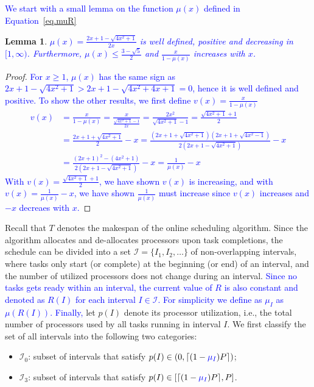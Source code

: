 \documentclass{article}
\newtheorem{lemma}{Lemma}
\newcommand\ratio{R\xspace}
\newcommand{\new}[1]{\textcolor{blue}{#1}}
\begin{document}
\new{We start with a small lemma on the function $\mu(x)$ defined in Equation~\ref{eq.muR}}
\begin{lemma}
\label{lem.muprop}
\new{$\mu(x)=\frac{2x+1-\sqrt{4x^2+1}}{2x}$ is well defined, positive and decreasing in $[1, \infty)$. Furthermore, $\mu(x) \leq \frac{3-\sqrt{5}}{2}$ and $\frac{x}{1-\mu(x)}$ increases with $x$.}
\end{lemma}
\begin{proof}
\new{For $x\geq 1$, $\mu(x)$ has the same sign as $2x+1-\sqrt{4x^2+1} > 2x+1-\sqrt{4x^2+4x+1}=0$, hence it is well defined and positive. To show the other results, we first define $v(x)=\frac{x}{1-\mu(x)}$
\begin{align*}
v(x)&=\frac{x}{1-\mu(x)}=\frac{x}{\frac{\sqrt{4x^2+1}-1}{2x}}= \frac{2x^2}{\sqrt{4x^2+1}-1}=\frac{\sqrt{4x^2+1}+1}{2}\\
&= \frac{2x+1+\sqrt{4x^2+1}}{2}-x=\frac{(2x+1+\sqrt{4x^2+1})(2x+1+\sqrt{4x^2-1})}{2(2x+1-\sqrt{4x^2+1})}-x \\
&= \frac{(2x+1)^2-(4x^2+1)}{2(2x+1-\sqrt{4x^2+1})}-x =\frac{1}{\mu(x)}-x
\end{align*}
With $v(x)= \frac{\sqrt{4x^2+1}+1}{2}$, we have shown $v(x)$ is increasing, and with $v(x)=\frac{1}{\mu(x)}-x$, we have shown $\frac{1}{\mu(x)}$ must increase since $v(x)$ increases and $-x$ decreaes with $x$.}
\end{proof}

Recall that $T$ denotes the makespan of the online scheduling algorithm. Since the algorithm allocates and de-allocates processors upon task completions, the schedule can be divided into a set $\mathcal{I} = \{I_1, I_2, \dots\}$ of non-overlapping intervals, where tasks only start (or complete) at the beginning (or end) of an interval, and the number of utilized processors does not change during an interval. \new{Since no tasks gets ready within an interval, the current value of $\ratio$ is also constant and denoted as $\ratio(I)$ for each interval  $I \in \mathcal{I}$. For simplicity we define as $\mu_I$ as $\mu(\ratio(I))$. Finally, }let $p(I)$ denote its processor utilization, i.e., the total number of processors used by all tasks running in interval $I$. We first classify the set of all intervals into the following two categories:
\begin{itemize}
\item $\mathcal{I}_0$: subset of intervals that satisfy $p(I) \in (0, \lceil (1-\new{\mu_I}) P \rceil)$;
\item $\mathcal{I}_3$: subset of intervals that satisfy $p(I) \in [\lceil (1-\new{\mu_I}) P \rceil, P]$.
\end{itemize}
\end{document}
